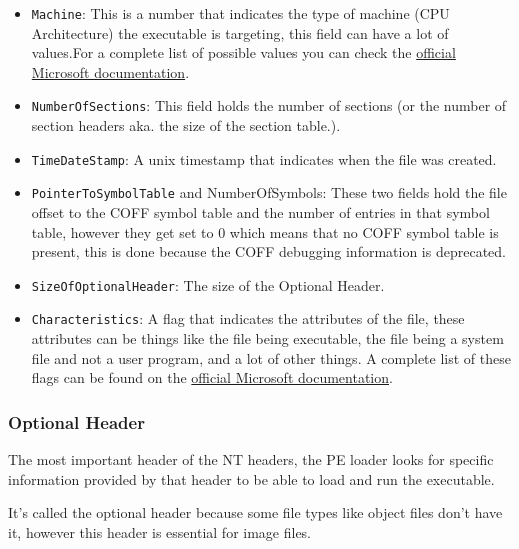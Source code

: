 \begin{itemize}

    \item \verb+Machine+: This is a number that indicates the type of machine (CPU Architecture) the executable is targeting, this field can have a lot of values.For a complete list of possible values you can check the \href{https://learn.microsoft.com/en-us/windows/win32/debug/pe-format#machine-types}{official Microsoft documentation}.
    \item \verb+NumberOfSections+: This field holds the number of sections (or the number of section headers aka. the size of the section table.).
    \item \verb+TimeDateStamp+: A unix timestamp that indicates when the file was created.
    \item \verb+PointerToSymbolTable+ and NumberOfSymbols: These two fields hold the file offset to the COFF symbol table and the number of entries in that symbol table, however they get set to 0 which means that no COFF symbol table is present, this is done because the COFF debugging information is deprecated.
    \item \verb+SizeOfOptionalHeader+: The size of the Optional Header.
    \item \verb+Characteristics+: A flag that indicates the attributes of the file, these attributes can be things like the file being executable, the file being a system file and not a user program, and a lot of other things. A complete list of these flags can be found on the \href{https://learn.microsoft.com/en-us/windows/win32/debug/pe-format#characteristics}{official Microsoft documentation}.

\end{itemize}


\subsubsection{Optional Header}
The most important header of the NT headers, the PE loader looks for specific information provided by that header to be able to load and run the executable.

It’s called the optional header because some file types like object files don’t have it, however this header is essential for image files. 

